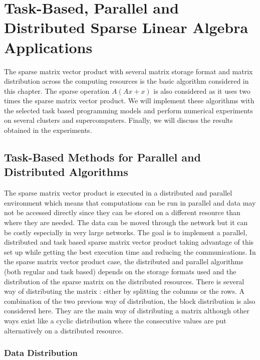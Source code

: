 %
\newcommand{\Array}{\KwSty{Array}}
\newcommand{\Integer}{\KwSty{Integer}}

\chapter{Task-Based, Parallel and Distributed Sparse Linear Algebra Applications \label{chap:exp_sparse}}
\graphicspath{{chapters/exp_sparse/}}

The sparse matrix vector product with several matrix storage format and matrix distribution across the computing resources is the basic algorithm considered in this chapter.
The sparse operation $A(Ax+x)$ is also considered as it uses two times the sparse matrix vector product.
We will implement these algorithms with the selected task based programming models and perform numerical experiments on several clusters and supercomputers.
Finally, we will discuss the results obtained in the experiments.


\section{Task-Based Methods for Parallel and Distributed Algorithms}
The sparse matrix vector product is executed in a distributed and parallel environment which means that computations can be run in parallel and data may not be accessed directly since they can be stored on a different resource than where they are needed.
The data can be moved through the network but it can be costly especially in very large networks.
The goal is to implement a parallel, distributed and task based sparse matrix vector product taking advantage of this set up while getting the best execution time and reducing the communications.
In the sparse matrix vector product case, the distributed and parallel algorithms (both regular and task based) depends on the storage formats used and the distribution of the sparse matrix on the distributed resources.
There is several way of distributing the matrix : either by splitting the columns or the rows.
A combination of the two previous way of distribution, the block distribution is also considered here.
They are the main way of distributing a matrix although other ways exist like a cyclic distribution where the consecutive values are put alternatively on a distributed resource.


\subsection{Data Distribution \label{sec:sla:data_distribution}}

